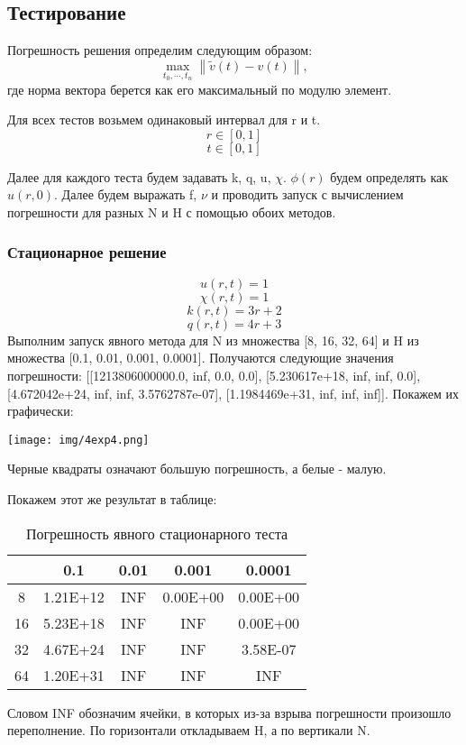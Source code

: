\subsection{Тестирование}

Погрешность решения определим следующим образом:
\[
  \max_{t_0, \cdots, t_n} \left\lVert \tilde{v}(t) - v(t) \right\rVert ,
\]
где норма вектора берется как его максимальный по модулю элемент.

Для всех тестов возьмем одинаковый интервал для r и t.
\[
  r \in [0, 1]
\]
\[
  t \in [0, 1]
\]

Далее для каждого теста будем задавать k, q, u, $\chi$. $\phi(r)$ будем определять как $u(r, 0)$. Далее будем выражать f, $\nu$ и проводить запуск с вычислением погрешности для разных N и H с помощью обоих методов.

\subsubsection{Стационарное решение}
\[  u(r, t) = 1 \]
\[  \chi(r, t) = 1 \]
\[  k(r, t) = 3r+2 \]
\[  q(r, t) = 4r+3 \]
Выполним запуск явного метода для N из множества [8, 16, 32, 64] и H из множества [0.1, 0.01, 0.001, 0.0001]. Получаются следующие значения погрешности: [[1213806000000.0, inf, 0.0, 0.0], [5.230617e+18, inf, inf, 0.0], [4.672042e+24, inf, inf, 3.5762787e-07], [1.1984469e+31, inf, inf, inf]]. Покажем их графически:
\begin{center}
  \texttt{[image: img/4exp4.png]}
\end{center}
Черные квадраты означают большую погрешность, а белые - малую.

Покажем этот же результат в таблице:
\begin{table}[H]
  \centering
  \begin{tabular}{c | c | c | c | c}
    \toprule
  & 0.1 & 0.01 & 0.001 & 0.0001 \\ 
\midrule
8 & 1.21E+12 & INF & 0.00E+00 & 0.00E+00 \\ 
16 & 5.23E+18 & INF & INF & 0.00E+00 \\ 
32 & 4.67E+24 & INF & INF & 3.58E-07 \\ 
64 & 1.20E+31 & INF & INF & INF \\ 
    \bottomrule
  \end{tabular}
  \caption{Погрешность явного стационарного теста}
\end{table}
Словом INF обозначим ячейки, в которых из-за взрыва погрешности произошло переполнение. По горизонтали откладываем H, а по вертикали N.

